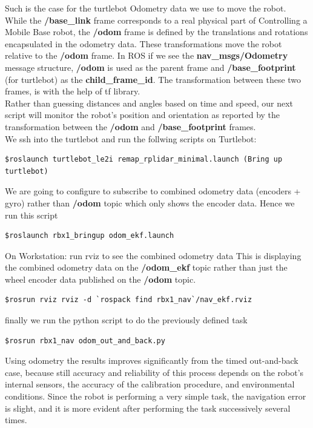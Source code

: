 \documentclass[10pt,a4paper]{article}
\begin{document}
Such is the case for the turtlebot Odometry data we use to move the robot.
While the \textbf{/base\_link} frame corresponds to a real physical part of Controlling a Mobile Base robot, the \textbf{/odom} frame is defined by the translations and rotations encapsulated in the odometry data. These transformations move the robot relative to the \textbf{/odom} frame.
In ROS if we see the \textbf{nav\_msgs/Odometry} message structure, \textbf{/odom }is used as the parent frame and \textbf{/base\_footprint} (for turtlebot) as the \textbf{child\_frame\_id}. The transformation between these two frames, is with the help of tf library.\\

Rather than guessing distances and angles based on time and speed, our next script will monitor the robot's position and orientation as reported by the transformation between the \textbf{/odom }and \textbf{/base\_footprint} frames.\\
 

We ssh into the turtlebot and run the follwing scripts
on Turtlebot:
\begin{lstlisting}[frame=single] 
$roslaunch turtlebot_le2i remap_rplidar_minimal.launch (Bring up turtlebot)
\end{lstlisting}
We are going to configure to subscribe to combined odometry data (encoders + gyro) 
rather than \textbf{/odom }topic which only shows the encoder data. Hence we run this script
\begin{lstlisting}[frame=single] 
$roslaunch rbx1_bringup odom_ekf.launch
\end{lstlisting}

On Workstation:
run rviz to see the combined odometry data
This is displaying the combined odometry data on the \textbf{/odom\_ekf} 
topic rather than just the wheel encoder data published on the \textbf{/odom} topic.
\begin{lstlisting}[frame=single] 
$rosrun rviz rviz -d `rospack find rbx1_nav`/nav_ekf.rviz
\end{lstlisting}

finally we run the python script to do the previously defined task 
\begin{lstlisting}[frame=single] 
$rosrun rbx1_nav odom_out_and_back.py
\end{lstlisting}

Using odometry the results improves significantly from the timed out-and-back case, because still accuracy and reliability of this process depends on the robot's internal sensors, the accuracy of the calibration procedure, and environmental conditions.
Since the robot is performing a very simple task, the navigation error is slight, and it is more evident after performing the task successively several times.
\end{document}
